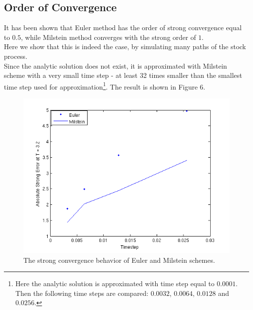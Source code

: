 \documentclass[11pt]{article}
\begin{document}
\subsection{Order of Convergence}
It has been shown that Euler method has the order of strong convergence equal to $0.5$, while Milstein method converges with the strong order of $1$.\\
Here we show that this is indeed the case, by simulating many paths of the stock process.\\ Since the analytic solution does not exist, it is approximated with Milstein scheme with a very small time step - at least 32 times smaller than the smallest time step used for approximation\footnote{Here the analytic solution is approximated with time step equal to $0.0001$. Then the following time steps are compared: $0.0032$, $0.0064$, $0.0128$ and $0.0256$.}.
The result is shown in Figure 6.
 \begin{figure}[h]
 \includegraphics{Figures/euler_milstein.png}
 \caption{The strong convergence behavior of Euler and Milstein schemes.}
\end{figure}
\clearpage
\end{document}
